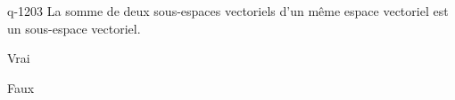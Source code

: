 \begin{truefalse}{q-1203}
La somme de deux sous-espaces vectoriels d'un même espace vectoriel est un sous-espace vectoriel.
\item* Vrai
\item Faux
\end{truefalse}

